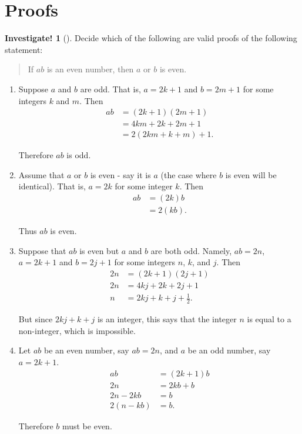 \documentclass[10pt,]{book}
\theoremstyle{plain}
\theoremstyle{definition}
\theoremstyle{definition}
\theoremstyle{definition}
\newtheorem{investigation}[project]{Investigate!}
\theoremstyle{definition}
\numberwithin{equation}{chapter}
\newcommand{\amp}{&}
\begin{document}
\section[{Proofs}]{Proofs}\label{sec_logic-proofs}
\begin{investigation}[]\label{investigation-15}
\hypertarget{p-1905}{}%
Decide which of the following are valid proofs of the following statement:%
\begin{quote}\hypertarget{blockquote-13}{}
\hypertarget{p-1906}{}%
If \(a b\) is an even number, then \(a\) or \(b\) is even.%
\end{quote}
\hypertarget{p-1907}{}%
%
\begin{enumerate}
\item\hypertarget{li-671}{}\hypertarget{p-1908}{}%
Suppose \(a\) and \(b\) are odd. That is, \(a=2k+1\) and \(b=2m+1\) for some integers \(k\) and \(m\). Then%
\begin{align*}
ab \amp =(2k+1)(2m+1)\\
\amp =4km+2k+2m+1\\
\amp =2(2km+k+m)+1.
\end{align*}
%
\par
\hypertarget{p-1909}{}%
Therefore \(ab\) is odd.%
\item\hypertarget{li-672}{}\hypertarget{p-1910}{}%
Assume that \(a\) or \(b\) is even - say it is \(a\) (the case where \(b\) is even will be identical). That is, \(a=2k\) for some integer \(k\). Then%
\begin{align*}
ab \amp =(2k)b\\
\amp =2(kb).
\end{align*}
%
\par
\hypertarget{p-1911}{}%
Thus \(ab\) is even.%
\item\hypertarget{li-673}{}\hypertarget{p-1912}{}%
Suppose that \(ab\) is even but \(a\) and \(b\) are both odd. Namely, \(ab = 2n\), \(a=2k+1\) and \(b=2j+1\) for some integers \(n\), \(k\), and \(j\). Then%
\begin{align*}
2n \amp =(2k+1)(2j+1)\\
2n \amp =4kj+2k+2j+1\\
n \amp = 2kj+k+j+\frac{1}{2}.
\end{align*}
%
\par
\hypertarget{p-1913}{}%
But since \(2kj+k+j\) is an integer, this says that the integer \(n\) is equal to a non-integer, which is impossible.%
\item\hypertarget{li-674}{}\hypertarget{p-1914}{}%
Let \(ab\) be an even number, say \(ab=2n\), and \(a\) be an odd number, say \(a=2k+1\).%
\begin{align*}
ab \amp =(2k+1)b\\
2n \amp =2kb+b\\
2n-2kb\amp =b\\
2(n-kb)\amp =b.
\end{align*}
%
\par
\hypertarget{p-1915}{}%
Therefore \(b\) must be even.%
\end{enumerate}
%
\end{investigation}
\end{document}
